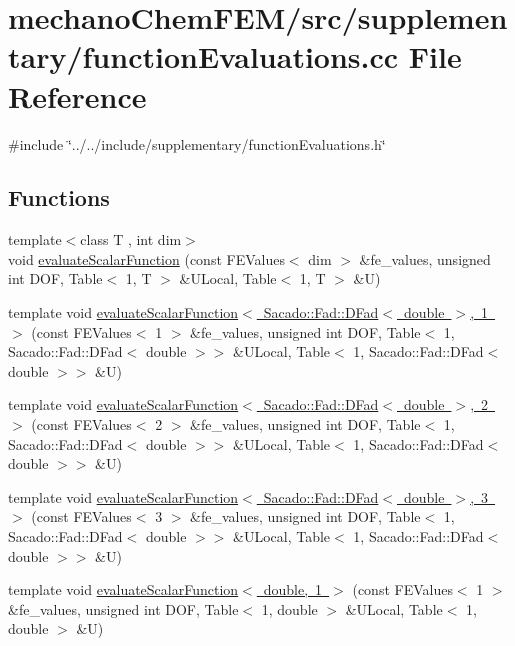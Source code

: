 \section{mechano\+Chem\+F\+E\+M/src/supplementary/function\+Evaluations.cc File Reference}
\label{function_evaluations_8cc}
{\ttfamily \#include \char`\"{}../../include/supplementary/function\+Evaluations.\+h\char`\"{}}\newline
\subsection*{Functions}
\begin{DoxyCompactItemize}
\item 
{\footnotesize template$<$class T , int dim$>$ }\\void \mbox{\hyperlink{group___evaluation_functions_ga399ae2353249293211c021848a64175c}{evaluate\+Scalar\+Function}} (const F\+E\+Values$<$ dim $>$ \&fe\+\_\+values, unsigned int D\+OF, Table$<$ 1, T $>$ \&U\+Local, Table$<$ 1, T $>$ \&U)
\item 
template void \mbox{\hyperlink{function_evaluations_8cc_a6856c1b1b83231bc778cecda3950533d}{evaluate\+Scalar\+Function$<$ Sacado\+::\+Fad\+::\+D\+Fad$<$ double $>$, 1 $>$}} (const F\+E\+Values$<$ 1 $>$ \&fe\+\_\+values, unsigned int D\+OF, Table$<$ 1, Sacado\+::\+Fad\+::\+D\+Fad$<$ double $>$$>$ \&U\+Local, Table$<$ 1, Sacado\+::\+Fad\+::\+D\+Fad$<$ double $>$$>$ \&U)
\item 
template void \mbox{\hyperlink{function_evaluations_8cc_af8ed01aa7f3c36625c149e3600d96714}{evaluate\+Scalar\+Function$<$ Sacado\+::\+Fad\+::\+D\+Fad$<$ double $>$, 2 $>$}} (const F\+E\+Values$<$ 2 $>$ \&fe\+\_\+values, unsigned int D\+OF, Table$<$ 1, Sacado\+::\+Fad\+::\+D\+Fad$<$ double $>$$>$ \&U\+Local, Table$<$ 1, Sacado\+::\+Fad\+::\+D\+Fad$<$ double $>$$>$ \&U)
\item 
template void \mbox{\hyperlink{function_evaluations_8cc_a57853d187be6c5f0a186e6ba62f141d6}{evaluate\+Scalar\+Function$<$ Sacado\+::\+Fad\+::\+D\+Fad$<$ double $>$, 3 $>$}} (const F\+E\+Values$<$ 3 $>$ \&fe\+\_\+values, unsigned int D\+OF, Table$<$ 1, Sacado\+::\+Fad\+::\+D\+Fad$<$ double $>$$>$ \&U\+Local, Table$<$ 1, Sacado\+::\+Fad\+::\+D\+Fad$<$ double $>$$>$ \&U)
\item 
template void \mbox{\hyperlink{function_evaluations_8cc_a436a979f117d9baba72821197a739e19}{evaluate\+Scalar\+Function$<$ double, 1 $>$}} (const F\+E\+Values$<$ 1 $>$ \&fe\+\_\+values, unsigned int D\+OF, Table$<$ 1, double $>$ \&U\+Local, Table$<$ 1, double $>$ \&U)

\end{DoxyCompactItemize}
